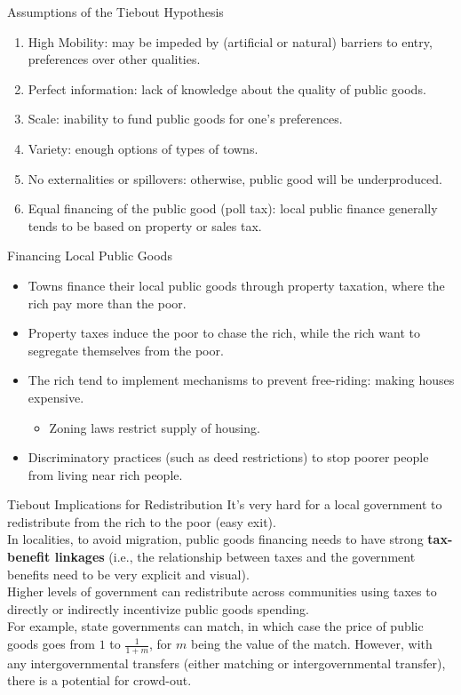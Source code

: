 \documentclass[10pt]{extarticle}
\begin{document}
  \begin{problem}{Assumptions of the Tiebout Hypothesis}
    \begin{enumerate}[(1)]
      \item High Mobility: may be impeded by (artificial or natural) barriers to entry, preferences over other qualities.
      \item Perfect information: lack of knowledge about the quality of public goods.
      \item Scale: inability to fund public goods for one's preferences.
      \item Variety: enough options of types of towns.
      \item No externalities or spillovers: otherwise, public good will be underproduced.
      \item Equal financing of the public good (poll tax): local public finance generally tends to be based on property or sales tax.
    \end{enumerate}
  \end{problem}
  \begin{problem}{Financing Local Public Goods}
    \begin{itemize}
      \item Towns finance their local public goods through property taxation, where the rich pay more than the poor.
      \item Property taxes induce the poor to chase the rich, while the rich want to segregate themselves from the poor.
      \item The rich tend to implement mechanisms to prevent free-riding: making houses expensive.
        \begin{itemize}
          \item Zoning laws restrict supply of housing.
        \end{itemize}
      \item Discriminatory practices (such as deed restrictions) to stop poorer people from living near rich people.
    \end{itemize}
  \end{problem}
  \begin{problem}{Tiebout Implications for Redistribution}
    It's very hard for a local government to redistribute from the rich to the poor (easy exit).\\

    In localities, to avoid migration, public goods financing needs to have strong \textbf{tax-benefit linkages} (i.e., the relationship between taxes and the government benefits need to be very explicit and visual).\\

    Higher levels of government can redistribute across communities using taxes to directly or indirectly incentivize public goods spending.\\

    For example, state governments can match, in which case the price of public goods goes from $1$ to  $\frac{1}{1+m}$, for $m$ being the value of the match. However, with any intergovernmental transfers (either matching or intergovernmental transfer), there is a potential for crowd-out.
  \end{problem}
\end{document}
